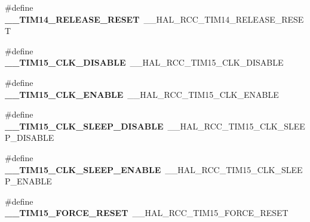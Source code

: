 \begin{DoxyCompactItemize}
\item 
\hypertarget{group___h_a_l___r_c_c___aliased_gadb150e0f413bbb69889b787e2633254b}{\#define {\bfseries \-\_\-\-\_\-\-T\-I\-M14\-\_\-\-R\-E\-L\-E\-A\-S\-E\-\_\-\-R\-E\-S\-E\-T}~\-\_\-\-\_\-\-H\-A\-L\-\_\-\-R\-C\-C\-\_\-\-T\-I\-M14\-\_\-\-R\-E\-L\-E\-A\-S\-E\-\_\-\-R\-E\-S\-E\-T}\label{group___h_a_l___r_c_c___aliased_gadb150e0f413bbb69889b787e2633254b}

\item 
\hypertarget{group___h_a_l___r_c_c___aliased_gaf520deb7e38c475a833720a8c449bfcd}{\#define {\bfseries \-\_\-\-\_\-\-T\-I\-M15\-\_\-\-C\-L\-K\-\_\-\-D\-I\-S\-A\-B\-L\-E}~\-\_\-\-\_\-\-H\-A\-L\-\_\-\-R\-C\-C\-\_\-\-T\-I\-M15\-\_\-\-C\-L\-K\-\_\-\-D\-I\-S\-A\-B\-L\-E}\label{group___h_a_l___r_c_c___aliased_gaf520deb7e38c475a833720a8c449bfcd}

\item 
\hypertarget{group___h_a_l___r_c_c___aliased_ga26324fde431019435e70c6f9546a9116}{\#define {\bfseries \-\_\-\-\_\-\-T\-I\-M15\-\_\-\-C\-L\-K\-\_\-\-E\-N\-A\-B\-L\-E}~\-\_\-\-\_\-\-H\-A\-L\-\_\-\-R\-C\-C\-\_\-\-T\-I\-M15\-\_\-\-C\-L\-K\-\_\-\-E\-N\-A\-B\-L\-E}\label{group___h_a_l___r_c_c___aliased_ga26324fde431019435e70c6f9546a9116}

\item 
\hypertarget{group___h_a_l___r_c_c___aliased_ga2edf101c47e6e927889d454f7c3e4c08}{\#define {\bfseries \-\_\-\-\_\-\-T\-I\-M15\-\_\-\-C\-L\-K\-\_\-\-S\-L\-E\-E\-P\-\_\-\-D\-I\-S\-A\-B\-L\-E}~\-\_\-\-\_\-\-H\-A\-L\-\_\-\-R\-C\-C\-\_\-\-T\-I\-M15\-\_\-\-C\-L\-K\-\_\-\-S\-L\-E\-E\-P\-\_\-\-D\-I\-S\-A\-B\-L\-E}\label{group___h_a_l___r_c_c___aliased_ga2edf101c47e6e927889d454f7c3e4c08}

\item 
\hypertarget{group___h_a_l___r_c_c___aliased_ga9d37421bcf87efc7643928dfafabecf3}{\#define {\bfseries \-\_\-\-\_\-\-T\-I\-M15\-\_\-\-C\-L\-K\-\_\-\-S\-L\-E\-E\-P\-\_\-\-E\-N\-A\-B\-L\-E}~\-\_\-\-\_\-\-H\-A\-L\-\_\-\-R\-C\-C\-\_\-\-T\-I\-M15\-\_\-\-C\-L\-K\-\_\-\-S\-L\-E\-E\-P\-\_\-\-E\-N\-A\-B\-L\-E}\label{group___h_a_l___r_c_c___aliased_ga9d37421bcf87efc7643928dfafabecf3}

\item 
\hypertarget{group___h_a_l___r_c_c___aliased_ga03c43f6aa09a714c4d091331110a209a}{\#define {\bfseries \-\_\-\-\_\-\-T\-I\-M15\-\_\-\-F\-O\-R\-C\-E\-\_\-\-R\-E\-S\-E\-T}~\-\_\-\-\_\-\-H\-A\-L\-\_\-\-R\-C\-C\-\_\-\-T\-I\-M15\-\_\-\-F\-O\-R\-C\-E\-\_\-\-R\-E\-S\-E\-T}\label{group___h_a_l___r_c_c___aliased_ga03c43f6aa09a714c4d091331110a209a}


\end{DoxyCompactItemize}
